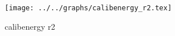 \begin{figure}[h] \centering\texttt{[image: ../../graphs/calibenergy\_r2.tex]}\caption{calibenergy r2}\label{gr:calibenergy_r2} \end{figure}

